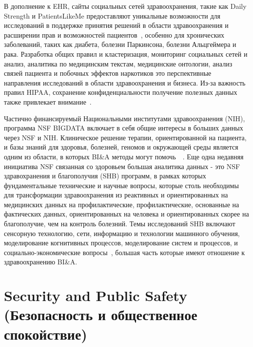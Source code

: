 В дополнение к EHR, сайты социальных сетей здравоохранения, такие как Daily
Strength и PatientsLikeMe предоставляют уникальные возможности для исследований
в поддержке принятия решений в области здравоохранения и расширении прав и возможностей пациентов~\cite{Miller:2012b}, особенно для хронических заболеваний, таких как
диабета, болезни Паркинсона, болезни Альцгеймера и рака. Разработка
общих правил и кластеризация, мониторинг социальных сетей
и анализ, аналитика по медицинским текстам, медицинские онтологии, анализ связей пациента и побочных эффектов наркотиков это
перспективные направления исследований в области здравоохранения и бизнеса. Из-за
важность правил HIPAA, сохранение конфиденциальности
получение полезных данных также привлекает внимание~\cite{Gelfand:2012}.

Частично финансируемый Национальными институтами здравоохранения (NIH),
программа NSF BIGDATA включает в себя общие
интересы в больших данных через NSF и NIH. Клиническое решение
терапии, ориентированной на пациента, и базы знаний для
здоровья, болезней, геномов и окружающей среды является одним из
области, в которых BI\&A методы могут помочь~\cite{Chen:2011b}~\cite{Wactlar:2011}. Еще одна недавняя инициатива NSF
связанная со здоровьем большая аналитика данных - это NSF здравохранения и благополучия (SHB)
программ, в рамках которых
фундаментальные технические и научные вопросы, которые
столь необходимы для трансформации здравоохранения из реактивных и
ориентированных на медицинских данных на профилактические, профилактические, основанные на фактических данных,
ориентированных на человека и ориентированных скорее на благополучие, чем на контроль болезний. Темы исследований SHB включают сенсорную технологию,
сети, информацию и технологии машинного обучения,
моделирование когнитивных процессов, моделирование систем и процессов,
и социально-экономические вопросы~\cite{Wactlar:2011}, большая часть
которые имеют отношение к здравоохранению BI\&A.

\section{Security and Public Safety (Безопасность и общественное спокойствие)}

